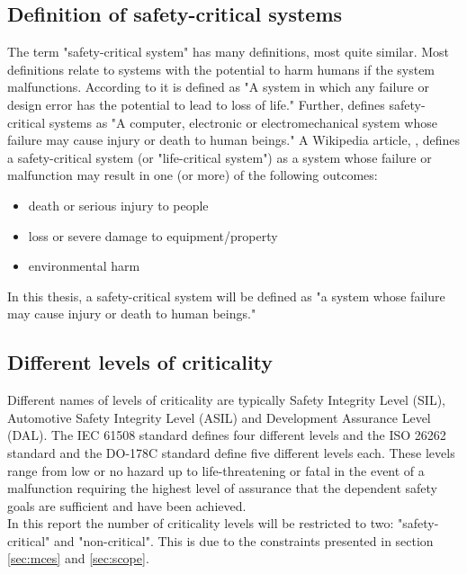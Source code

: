 \subsection{Definition of safety-critical systems}
The term "safety-critical system" has many definitions, most quite similar. Most definitions relate to systems with the potential to harm humans if the system malfunctions. According to \cite{website:encyclopedia} it is defined as "A system in which any failure or design error has the potential to lead to loss of life." Further, \cite{website:dictionary} defines safety-critical systems as "A computer, electronic or electromechanical system whose failure may cause injury or death to human beings." A Wikipedia article, \cite{website:wikipedia}, defines a safety-critical system (or "life-critical system") as a system whose failure or malfunction may result in one (or more) of the following outcomes:
\begin{itemize}
\item death or serious injury to people
\item loss or severe damage to equipment/property
\item environmental harm
\end{itemize}
In this thesis, a safety-critical system will be defined as "a system whose failure may cause injury or death to human beings."

\subsection{Different levels of criticality}
Different names of levels of criticality are typically Safety Integrity Level (SIL), Automotive Safety Integrity Level (ASIL) and Development Assurance Level (DAL). The IEC 61508 standard \cite{IEC61508} defines four different levels and the ISO 26262 standard \cite{ISO26262} and the DO-178C standard \cite{DO178C} define five different levels each. These levels range from low or no hazard up to life-threatening or fatal in the event of a malfunction requiring the highest level of assurance that the dependent safety goals are sufficient and have been achieved.\\

In this report the number of criticality levels will be restricted to two: "safety-critical" and "non-critical". This is due to the constraints presented in section \ref{sec:mces} and \ref{sec:scope}.

